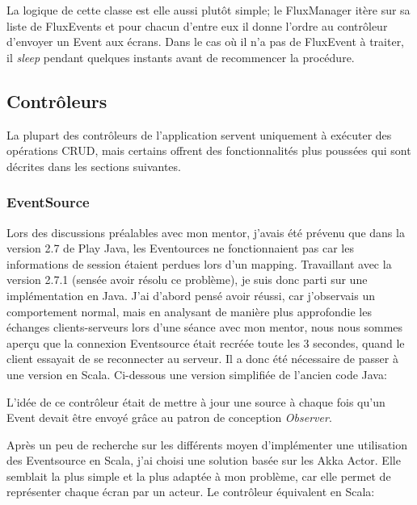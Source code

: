 \documentclass[french]{article}
\begin{document}


La logique de cette classe est elle aussi plutôt simple; le FluxManager itère sur sa liste de FluxEvents et pour chacun d'entre eux il donne l'ordre au contrôleur d'envoyer un Event aux écrans. Dans le cas où il n'a pas de FluxEvent à traiter, il \textit{sleep} pendant quelques instants avant de recommencer la procédure.

\newpage
\subsection{Contrôleurs}

La plupart des contrôleurs de l'application servent uniquement à exécuter des opérations CRUD, mais certains offrent des fonctionnalités plus poussées qui sont décrites dans les sections suivantes.

\subsubsection{EventSource}

Lors des discussions préalables avec mon mentor, j'avais été prévenu que dans la version 2.7 de Play Java, les Eventources ne fonctionnaient pas car les informations de session étaient perdues lors d'un mapping. Travaillant avec la version 2.7.1 (sensée avoir résolu ce problème), je suis donc parti sur une implémentation en Java. J'ai d'abord pensé avoir réussi, car j'observais un comportement normal, mais en analysant de manière plus approfondie les échanges clients-serveurs lors d'une séance avec mon mentor, nous nous sommes aperçu que la connexion Eventsource était recréée toute les 3 secondes, quand le client essayait de se reconnecter au serveur. Il a donc été nécessaire de passer à une version en Scala.\newline
Ci-dessous une version simplifiée de l'ancien code Java:



L'idée de ce contrôleur était de mettre à jour une source à chaque fois qu'un Event devait être envoyé grâce au patron de conception \textit{Observer}. 
\newpage

Après un peu de recherche sur les différents moyen d'implémenter une utilisation des Eventsource en Scala, j'ai choisi une solution basée sur les Akka Actor. Elle semblait la plus simple et la plus adaptée à mon problème, car elle permet de représenter chaque écran par un acteur. \newline
Le contrôleur équivalent en Scala:
\end{document}

